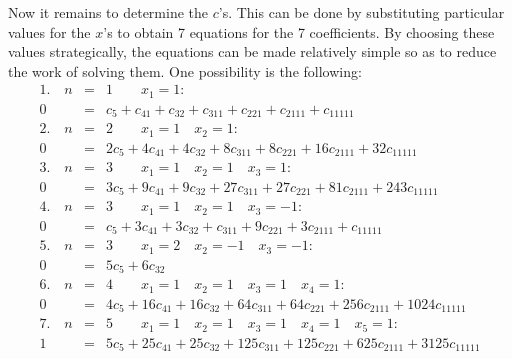 \documentclass[12pt]{article}
\begin{document}
Now it remains to determine the $c$'s.  This can be done by substituting particular values for the $x$'s to obtain 7 equations for the 7 coefficients.  By choosing these values strategically, the equations can be made relatively simple so as to reduce the work of solving them.  One possibility is the following:
\begin{eqnarray*}
1. \quad n &=& 1 \qquad x_1 = 1 : \\
0 &=& c_5 + c_{41} + c_{32} + c_{311} + c_{221} + c_{2111} + c_{11111} \\
2. \quad n &=& 2 \qquad x_1 = 1 \quad x_2 = 1 : \\
0 &=& 2 c_5 + 4 c_{41} + 4 c_{32} + 8 c_{311} + 8 c_{221} + 16 c_{2111} + 32 c_{11111} \\
3. \quad n &=& 3 \qquad x_1 = 1 \quad x_2 = 1 \quad x_3 = 1 : \\
0 &=& 3 c_5 + 9 c_{41} + 9 c_{32} + 27 c_{311} + 27 c_{221} + 81 c_{2111} + 243 c_{11111} \\
4. \quad n &=& 3 \qquad x_1 = 1 \quad x_2 = 1 \quad x_3 = -1 : \\
0 &=& c_5 + 3 c_{41} + 3 c_{32} + c_{311} + 9 c_{221} + 3 c_{2111} + c_{11111} \\
5. \quad n &=& 3 \qquad x_1 = 2 \quad x_2 = -1 \quad x_3 = -1 : \\
0 &=& 5 c_5 + 6 c_{32} \\
6. \quad n &=& 4 \qquad x_1 = 1 \quad x_2 = 1 \quad x_3 = 1 \quad x_4 = 1: \\
0 &=& 4 c_5 + 16 c_{41} + 16 c_{32} + 64 c_{311} + 64 c_{221} + 256 c_{2111} + 1024 c_{11111} \\
7. \quad n &=& 5 \qquad x_1 = 1 \quad x_2 = 1 \quad x_3 = 1 \quad x_4 = 1 \quad x_5 = 1: \\
1 &=& 5 c_5 + 25 c_{41} + 25 c_{32} + 125 c_{311} + 125 c_{221} + 625 c_{2111} + 3125 c_{11111} \\
\end{eqnarray*}
\end{document}
